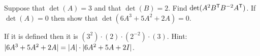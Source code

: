 
\begin{Exercise}[
name={},
title={}, 
difficulty=0,
origin={\cite{JH}}]
\Question Suppose that \( \det(A)=3 \) and that \( \det(B)=2 \).
Find \( \det(A^2{{B}^{\mathsf{T}}}B^{-2}{{A}^{\mathsf{T}}} ) \).
\Question If \( \det(A)=0 \) then show that \( \det(6A^3+5A^2+2A)=0 \).
\end{Exercise}

\begin{Answer}
\Question If it is defined then it is \( (3^2)\cdot (2)\cdot (2^{-2})\cdot (3) \).
\Question Hint: \( \deter{6A^3+5A^2+2A}=\deter{A}\cdot\deter{6A^2+5A+2I} \).
\end{Answer}
